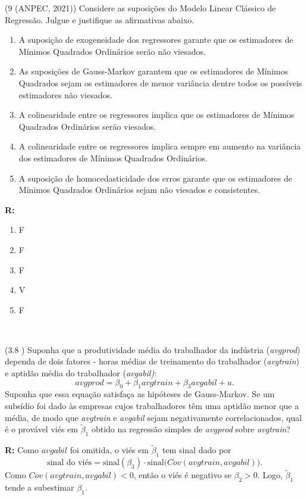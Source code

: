 \documentclass[12pt,letterpaper, onecolumn]{exam}
\renewenvironment{solution}
  {\par\noindent\textbf{R:}\enspace\color{blue}}
  {\par\color{black}}
\begin{document}
\begin{questions}

    \question (9 (ANPEC, 2021)) Considere as suposições do Modelo Linear Clássico de Regressão. Julgue e justifique as afirmativas abaixo.
    \begin{enumerate}[label=(\arabic*), start=0]
    \item A suposição de exogeneidade dos regressores garante que os estimadores de Mínimos Quadrados Ordinários serão não viesados.
    \item As suposições de Gauss-Markov garantem que os estimadores de Mínimos Quadrados sejam os estimadores de menor variância dentre todos os possíveis estimadores não viesados.
    \item A colinearidade entre os regressores implica que os estimadores de Mínimos Quadrados Ordinários serão viesados.
    \item A colinearidade entre os regressores implica sempre em aumento na variância dos estimadores de Mínimos Quadrados Ordinários.
    \item A suposição de homocedasticidade dos erros garante que os estimadores de Mínimos Quadrados Ordinários sejam não viesados e consistentes.
    \end{enumerate}
    \begin{solution}
\begin{enumerate}[label=(\arabic*), start=0]
    \item F
    \item F
    \item F
    \item V
    \item F
\end{enumerate}
\end{solution}
\
\


    
    \question\qstar (3.8 \citep{wooldridge2016}) Suponha que a produtividade média do trabalhador da indústria (\textit{avgprod}) dependa de dois fatores - horas médias de treinamento do trabalhador (\textit{avgtrain}) e aptidão média do trabalhador (\textit{avgabil)}:\begin{equation*}
        avgprod = \beta_0 + \beta_1avgtrain + \beta_3 avgabil + u\text{.}
    \end{equation*}Suponha que essa equação satisfaça as hipóteses de Gauss-Markov. Se um subsídio foi dado às empresas cujos trabalhadores têm uma aptidão menor que a média, de modo que \textit{avgtrain} e \textit{avgabil} sejam negativamente correlacionados, qual é o provável viés em $\tilde\beta_1$ obtido na regressão simples de \textit{avgprod} sobre \textit{avgtrain}?
    \begin{solution}
Como \(avgabil\) foi omitida, o viés em \(\tilde\beta_1\) tem sinal dado por
\[
\text{sinal do viés} = \text{sinal}(\beta_3)\cdot \text{sinal}\big(Cov(avgtrain,avgabil)\big).
\]
Como \(Cov(avgtrain,avgabil)<0\), então o viés é negativo se \(\beta_2>0\). Logo, \(\tilde\beta_1\) tende a subestimar \(\beta_1\).
\end{solution}



\end{questions}
\end{document}
